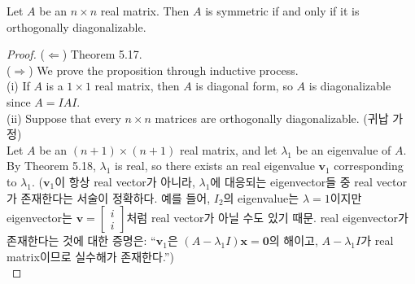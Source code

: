 \begin{theorem}
	Let $A$ be an $n \times n$ real matrix. Then $A$ is symmetric if and only if it is orthogonally diagonalizable.
\end{theorem}
\begin{proof}
	($\Leftarrow$) Theorem 5.17. \\
	
	($\Rightarrow$) We prove the proposition through inductive process. \\
	(i) If $A$ is a $1 \times 1$ real matrix, then $A$ is diagonal form, so $A$ is diagonalizable since $A = IAI$. \\
	
	(ii) Suppose that every $n \times n$ matrices are orthogonally diagonalizable. {\color{blue}(귀납 가정)} \\
	
	Let $A$ be an $(n+1) \times (n+1)$ real matrix, and let $\lambda_1$ be an eigenvalue of $A$. By Theorem 5.18, $\lambda_1$ is real, so there exists an real eigenvalue $\textbf{v}_1$ corresponding to $\lambda_1$. {\color{blue}($\textbf{v}_1$이 항상 real vector가 아니라, $\lambda_1$에 대응되는 eigenvector들 중 real vector가 존재한다는 서술이 정확하다. 예를 들어, $I_2$의 eigenvalue는 $\lambda = 1$이지만 eigenvector는 $\textbf{v} = \begin{bmatrix} i \\ i \end{bmatrix}$처럼 real vector가 아닐 수도 있기 때문. real eigenvector가 존재한다는 것에 대한 증명은: ``$\textbf{v}_1$은 $(A-\lambda_1I)\textbf{x}=\textbf{0}$의 해이고, $A-\lambda_1I$가 real matrix이므로 실수해가 존재한다.'')} \\
	

\end{proof}
